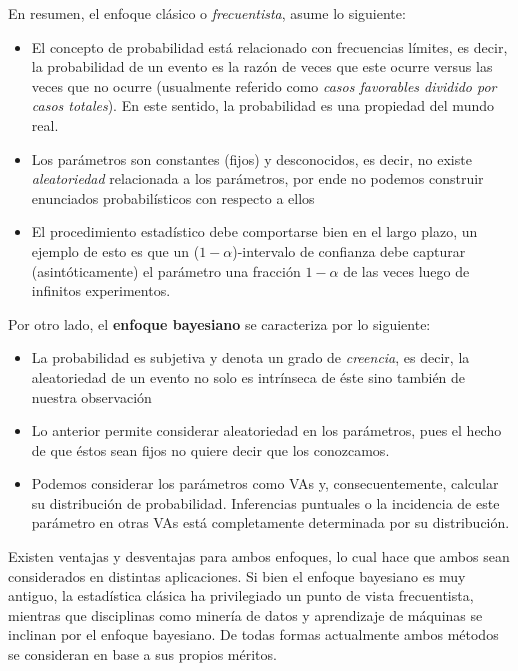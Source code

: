 En resumen, el enfoque clásico o \emph{frecuentista}, asume lo siguiente: 
\begin{itemize}
	\item El concepto de probabilidad está relacionado con frecuencias límites, es decir, la probabilidad de un evento es la razón de veces que este ocurre versus las veces que no ocurre (usualmente referido como \emph{casos favorables dividido por casos totales}). En este sentido, la probabilidad es una propiedad del mundo real. 
	\item Los parámetros son constantes (fijos) y desconocidos, es decir, no existe \emph{aleatoriedad} relacionada a los parámetros, por ende no podemos construir enunciados probabilísticos con respecto a ellos
	\item El procedimiento estadístico debe comportarse bien en el largo plazo, un ejemplo de esto es que un ($1-\alpha$)-intervalo de confianza debe capturar (asintóticamente) el parámetro una fracción $1-\alpha$ de las veces luego de infinitos experimentos. 
\end{itemize}

Por otro lado, el \textbf{enfoque bayesiano} se caracteriza por lo siguiente: 

\begin{itemize}
 	\item La probabilidad es subjetiva y denota un grado de \emph{creencia}, es decir, la aleatoriedad de un evento no solo es intrínseca de éste sino también de nuestra observación
 	\item Lo anterior permite considerar aleatoriedad en los parámetros, pues el hecho de que éstos sean fijos no quiere decir que los conozcamos. 
 	\item Podemos considerar los parámetros como VAs y, consecuentemente, calcular su distribución de probabilidad. Inferencias puntuales o la incidencia de este parámetro en otras VAs está completamente determinada por su distribución.
 \end{itemize}
 Existen ventajas y desventajas para ambos enfoques, lo cual hace que ambos sean considerados en distintas aplicaciones. Si bien el enfoque bayesiano es muy antiguo, la estadística clásica ha privilegiado un punto de vista frecuentista, mientras que disciplinas como minería de datos y aprendizaje de máquinas se inclinan por el enfoque bayesiano. De todas formas actualmente ambos métodos se consideran en base a sus propios méritos. 
 
